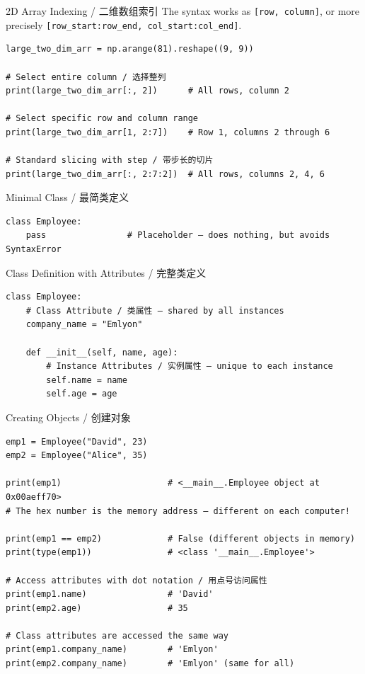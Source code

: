 \documentclass[11pt,a4paper]{report}
\let\oldtexttt\texttt
\renewcommand{\texttt}[1]{\textcolor{mainblue}{\oldtexttt{#1}}}
\begin{document}
\begin{examplebox}{2D Array Indexing / 二维数组索引}
    The syntax works as \texttt{[row, column]}, or more precisely \texttt{[row\_start:row\_end, col\_start:col\_end]}.
\begin{lstlisting}
large_two_dim_arr = np.arange(81).reshape((9, 9))

# Select entire column / 选择整列
print(large_two_dim_arr[:, 2])      # All rows, column 2

# Select specific row and column range
print(large_two_dim_arr[1, 2:7])    # Row 1, columns 2 through 6

# Standard slicing with step / 带步长的切片
print(large_two_dim_arr[:, 2:7:2])  # All rows, columns 2, 4, 6
\end{lstlisting}
\end{examplebox}

\begin{examplebox}{Minimal Class / 最简类定义}
\begin{lstlisting}
class Employee:
    pass                # Placeholder — does nothing, but avoids SyntaxError
\end{lstlisting}
\end{examplebox}

\begin{examplebox}{Class Definition with Attributes / 完整类定义}
\begin{lstlisting}
class Employee:
    # Class Attribute / 类属性 — shared by all instances
    company_name = "Emlyon"

    def __init__(self, name, age):
        # Instance Attributes / 实例属性 — unique to each instance
        self.name = name
        self.age = age
\end{lstlisting}
\end{examplebox}

\begin{examplebox}{Creating Objects / 创建对象}
\begin{lstlisting}
emp1 = Employee("David", 23)
emp2 = Employee("Alice", 35)

print(emp1)                     # <__main__.Employee object at 0x00aeff70>
# The hex number is the memory address — different on each computer!

print(emp1 == emp2)             # False (different objects in memory)
print(type(emp1))               # <class '__main__.Employee'>

# Access attributes with dot notation / 用点号访问属性
print(emp1.name)                # 'David'
print(emp2.age)                 # 35

# Class attributes are accessed the same way
print(emp1.company_name)        # 'Emlyon'
print(emp2.company_name)        # 'Emlyon' (same for all)
\end{lstlisting}
\end{examplebox}
\end{document}
